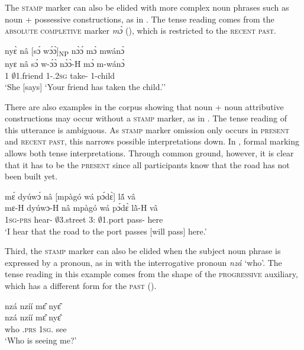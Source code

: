 The \textsc{stamp} marker can also be elided with more complex noun phrases such as noun + possessive constructions, as in . The tense reading comes from the \textsc{absolute completive} marker {\itshape mɔ̀} (), which is restricted to the \textsc{recent past}.

\ea \label{OmNPoss}
  \glll nyɛ̀ nâ [sɔ́ wɔ́ɔ̀]\textsubscript{NP} nɔ̀ɔ́ mɔ̀ mwánɔ̀ \\
        nyɛ nâ {\db}sɔ́ w-ɔ́ɔ̀ nɔ̀ɔ̀-H mɔ̀ m-wánɔ̀ \\
      1 {\COMP} {\db}$\emptyset$1.friend 1-{\POSS}.2\textsc{sg} take-{\R} {\PRF} 1-child   \\
    \trans `She [says] `Your friend has taken the child.''
\z

There are also examples in the corpus showing that noun + noun attributive constructions may occur without a \textsc{stamp} marker, as in . The tense reading of this utterance is ambiguous. As \textsc{stamp} marker omission only occurs in \textsc{present} and \textsc{recent past}, this narrows possible interpretations down. In , formal marking allows both tense interpretations. Through common ground, however, it is clear that it has to be the \textsc{present} since all participants know that the road has not been built yet.

\ea \label{OmNN}
  \glll  mɛ́ dyúwɔ́ nâ [mpàgó wá pɔ́dɛ̀]\textsubscript{\NP} lã́ vâ \\
        mɛ-H dyúwɔ-H nâ {\db}mpàgó wá pɔ́dɛ̀ lã̀-H vâ \\
            1\textsc{sg}-\textsc{prs} hear-{\R} {\COMP} {\db}$\emptyset$3.street 3:{\ATT} $\emptyset$1.port pass-{\R} here \\
    \trans `I hear that the road to the port passes [will pass] here.'
\z

Third, the \textsc{stamp} marker can also be elided when the subject noun phrase is expressed by a pronoun, as in  with the interrogative pronoun {\itshape nzá} `who'. The tense reading in this example comes from the shape of the \textsc{progressive} auxiliary, which has a different form for the \textsc{past} ().


\ea \label{OmInterr}
  \glll nzá nzíí mɛ̂ nyɛ̂ \\
    nzá nzíí mɛ̂ nyɛ̂ \\
         who {\PROG}.\textsc{prs} 1\textsc{sg}.{\OBJ} see\\
    \trans `Who is seeing me?'
\z



